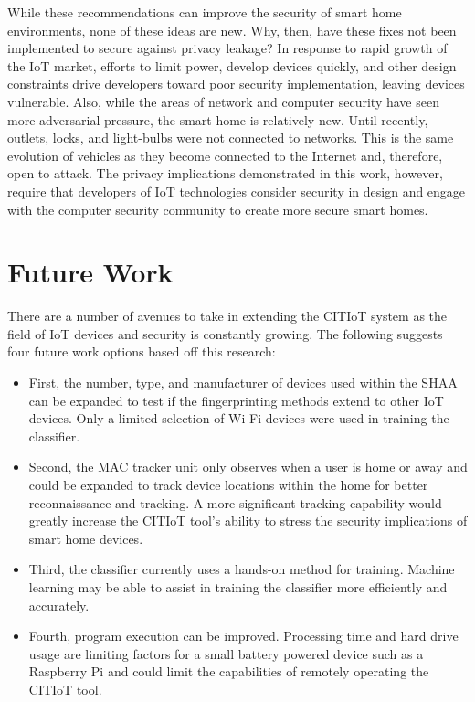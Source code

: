 \documentclass[12pt,letterpaper,oneside]{book}
\begin{document}
		While these recommendations can improve the security of smart home environments, none of these ideas are new. Why, then, have these fixes not been implemented to secure against privacy leakage? In response to rapid growth of the \ac{IoT} market, efforts to limit power, develop devices quickly, and other design constraints drive developers toward poor security implementation, leaving devices vulnerable. Also, while the areas of network and computer security have seen more adversarial pressure, the smart home is relatively new. Until recently, outlets, locks, and light-bulbs were not connected to networks. This is the same evolution of vehicles as they become connected to the Internet and, therefore, open to attack. The privacy implications demonstrated in this work, however, require that developers of \ac{IoT} technologies consider security in design and engage with the computer security community to create more secure smart homes.


		\section{Future Work} \label{futureWork}
		There are a number of avenues to take in extending the \ac{CITIoT} system as the field of \ac{IoT} devices and security is constantly growing. The following suggests four future work options based off this research:
		
		\begin{itemize}
			\item First, the number, type, and manufacturer of devices used within the \ac{SHAA} can be expanded to test if the fingerprinting methods extend to other \ac{IoT} devices. Only a limited selection of Wi-Fi devices were used in training the classifier.
			\item Second, the \ac{MAC} tracker unit only observes when a user is home or away and could be expanded to track device locations within the home for better reconnaissance and tracking. A more significant tracking capability would greatly increase the \ac{CITIoT} tool's ability to stress the security implications of smart home devices.
			\item Third, the classifier currently uses a hands-on method for training. Machine learning may be able to assist in training the classifier more efficiently and accurately.
			\item Fourth, program execution can be improved. Processing time and hard drive usage are limiting factors for a small battery powered device such as a Raspberry Pi and could limit the capabilities of remotely operating the \ac{CITIoT} tool.
		
		\end{itemize}
		
\end{document}
